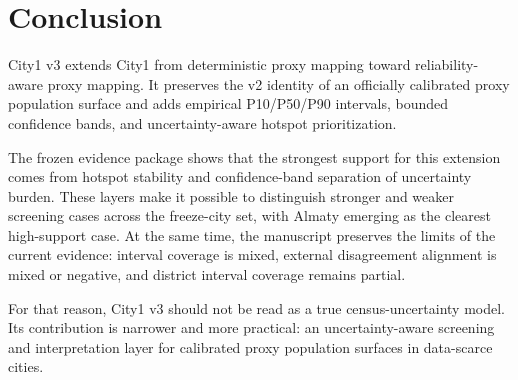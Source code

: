 \section{Conclusion}

City1 v3 extends City1 from deterministic proxy mapping toward reliability-aware proxy mapping. It preserves the v2 identity of an officially calibrated proxy population surface and adds empirical P10/P50/P90 intervals, bounded confidence bands, and uncertainty-aware hotspot prioritization.

The frozen evidence package shows that the strongest support for this extension comes from hotspot stability and confidence-band separation of uncertainty burden. These layers make it possible to distinguish stronger and weaker screening cases across the freeze-city set, with Almaty emerging as the clearest high-support case. At the same time, the manuscript preserves the limits of the current evidence: interval coverage is mixed, external disagreement alignment is mixed or negative, and district interval coverage remains partial.

For that reason, City1 v3 should not be read as a true census-uncertainty model. Its contribution is narrower and more practical: an uncertainty-aware screening and interpretation layer for calibrated proxy population surfaces in data-scarce cities.

